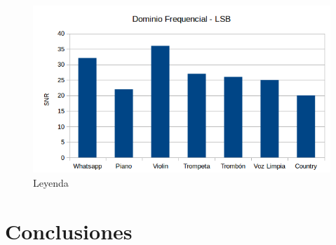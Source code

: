 \documentclass[conference,a4paper,10pt, oneside,final]{tfmpd}
\begin{document}
\begin{figure}[h!]
 \centering
 \includegraphics[keepaspectratio=true, width=240 px]{./graficos/dominio-frequencial-lsb-snr.png}
 \caption{Leyenda}
 \label{fig: Etiqueta}
\end{figure}


\section{Conclusiones}

\nocite{*}


\end{document}
